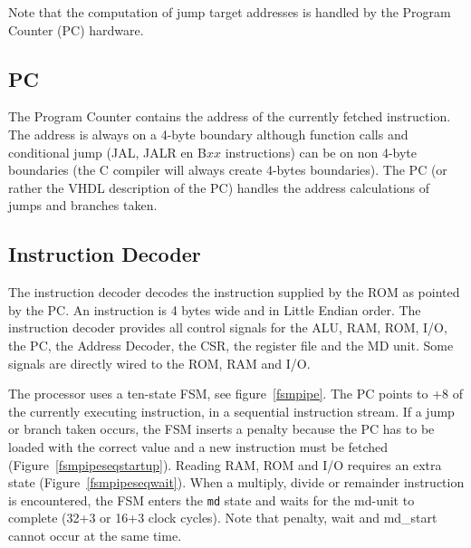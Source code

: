 \documentclass[12pt]{article}
\begin{document}
Note that the computation of jump target addresses is handled by the Program Counter (PC) hardware.

\subsection{PC}
\label{sec:pc}
The Program Counter contains the address of the currently fetched instruction. The address is always on a 4-byte boundary although function calls and conditional jump (JAL, JALR en B$xx$ instructions) can be on non 4-byte boundaries (the C compiler will always create 4-bytes boundaries). The PC (or rather the VHDL description of the PC) handles the address calculations of jumps and branches taken.

\subsection{Instruction Decoder}
\label{sec:instructiondecoder}
The instruction decoder decodes the instruction supplied by the ROM as pointed by the PC. An instruction is 4 bytes wide and in Little Endian order. The instruction decoder provides all control signals for the ALU, RAM, ROM, I/O, the PC, the Address Decoder, the CSR, the register file and the MD unit. Some signals are directly wired to the ROM, RAM and I/O.

The processor uses a ten-state FSM, see figure~\ref{fsmpipe}. The PC points to +8 of the currently executing instruction, in a sequential instruction stream. If a jump or branch taken occurs, the FSM inserts a penalty because the PC has to be loaded with the correct value and a new instruction must be fetched (Figure~\ref{fsmpipeseqstartup}). Reading RAM, ROM and I/O requires an extra state (Figure~\ref{fsmpipeseqwait}). When a multiply, divide or remainder instruction is encountered, the FSM enters the \texttt{md} state and waits for the md-unit to complete (32+3 or 16+3 clock cycles). Note that penalty, wait and md\_start cannot occur at the same time.
\end{document}
